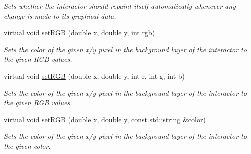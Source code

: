 \begin{DoxyCompactItemize}
\begin{DoxyCompactList}\small\item\em Sets whether the interactor should repaint itself automatically whenever any change is made to its graphical data. \end{DoxyCompactList}\item 
virtual void \mbox{\hyperlink{classGDrawingSurface_a8bcbd65fa784bdab1e66a9efd381162d}{set\+R\+GB}} (double x, double y, int rgb)
\begin{DoxyCompactList}\small\item\em Sets the color of the given x/y pixel in the background layer of the interactor to the given R\+GB values. \end{DoxyCompactList}\item 
virtual void \mbox{\hyperlink{classGDrawingSurface_a81202471d4fc9f2015aef0bc073acfab}{set\+R\+GB}} (double x, double y, int r, int g, int b)
\begin{DoxyCompactList}\small\item\em Sets the color of the given x/y pixel in the background layer of the interactor to the given R\+GB values. \end{DoxyCompactList}\item 
virtual void \mbox{\hyperlink{classGDrawingSurface_ae9a228792d4bb4b628350f39eaa3ad12}{set\+R\+GB}} (double x, double y, const std\+::string \&color)
\begin{DoxyCompactList}\small\item\em Sets the color of the given x/y pixel in the background layer of the interactor to the given color. \end{DoxyCompactList}\end{DoxyCompactItemize}

